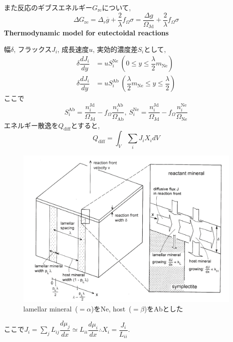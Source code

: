 \documentclass[a4paper,12pt]{jsarticle}
\begin{document}
また反応のギブスエネルギー$G_{\text{re}}$について, 
\begin{equation*}
\Delta G_{\text{re}}  = \Delta_r \overline{g} + \dfrac{2}{\lambda} f_{\Omega} \sigma =\dfrac{\Delta g}{\Omega_{\text{Jd}}} + \dfrac{2}{\lambda}f_{\Omega} \sigma
\end{equation*}
{\Large \textbf{Thermodynamic model for eutectoidal reactions}}

幅$\delta$, フラックス$J_i$, 成長速度$u$, 実効的濃度差$S_i$として,
\begin{align*}
 \delta \dfrac{d J_i}{dy} &= u S_i^{\text{Ne}}\ \left(0 \le y \le \dfrac{\lambda}{2}m_{\text{Ne}}\right)\\
\delta \dfrac{d J_i}{dy} &= u S_i^{\text{Ab}}\ \left(\dfrac{\lambda}{2} m_{\text{Ne}} \le y \le \dfrac{\lambda}{2}\right)
\end{align*}
ここで
\begin{equation*}
 S_i^{\text{Ab}} = \dfrac{n_i^{\text{Jd}}}{\Omega_{\text{Jd}}} - f_{\Omega} \dfrac{n_i^{\text{Ab}}}{\Omega_{\text{Ab}}},\  S_i^{\text{Ne}} = \dfrac{n_i^{\text{Jd}}}{\Omega_{\text{Jd}}} - f_{\Omega} \dfrac{n_i^{\text{Ne}}}{\Omega_{\text{Ne}}}
\end{equation*}
エネルギー散逸を$Q_{\text{diff}}$とすると, 
\begin{equation*}
 Q_{\text{diff}} = \int_V \sum_i J_i X_i dV
\end{equation*}
\begin{figure}[htbp]
 \centering
 \includegraphics[width=0.9\linewidth]{ashworth1.png}
\caption{lamellar mineral~($=\alpha$)をNe, host~($=\beta$)をAbとした}
\end{figure}
ここで$\displaystyle J_{i} = \sum_{j}L_{i j} \dfrac{d \mu_j}{dx} \simeq  L_{ii}\dfrac{d\mu_i}{dx} \therefore X_i = \dfrac{J_i}{L_{ii}}$.
\end{document}
